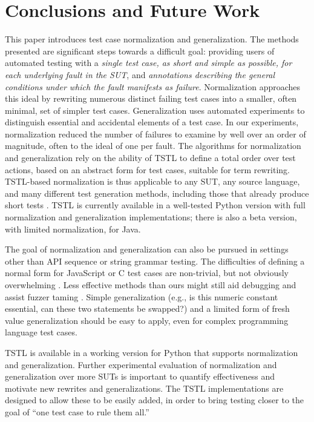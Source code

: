 \section{Conclusions and Future Work}

This paper introduces test case normalization and generalization.  The
methods presented are significant steps towards a difficult goal: providing
users of automated testing with a \emph{single test case, as short and
  simple as possible, for each underlying fault in the SUT}, and
\emph{annotations describing the general conditions under which the
  fault manifests as failure}.  Normalization approaches this ideal by
rewriting numerous distinct failing test cases into a smaller, often
minimal, set of simpler test cases.  Generalization uses
automated experiments to distinguish essential and accidental elements of
a test case.   In our experiments, normalization reduced the
number of failures to examine by well over an order of magnitude, often  to the ideal of one per fault.  The algorithms for normalization and generalization rely
on the ability of TSTL \cite{NFM15,ISSTA15} to define a total order
over test actions, based on an abstract form for test cases, suitable
for term rewriting.  TSTL-based normalization is thus applicable to
any SUT, any source language, and many different test generation methods,
including those that already produce short tests
\cite{FA11,SoftBET}.  TSTL is currently available in a well-tested Python
version with full normalization and generalization implementations;
there is also a
beta version, with limited normalization, for Java.


 The goal of normalization and generalization can also be pursued in
settings other than API sequence or string grammar testing.  The
difficulties of defining a normal form for JavaScript \cite{jsfunfuzz}
or C \cite{csmith} test cases are non-trivial, but not obviously
overwhelming \cite{CReduce}. Less effective methods
than ours might still aid debugging and assist fuzzer taming
\cite{PLDI13}.  Simple generalization (e.g., is this numeric constant
essential, can these two statements be swapped?) and a limited form of
fresh value generalization should be easy to apply, even for complex
programming language test cases.  

TSTL is available in a working version for Python \cite{tstl} that
supports normalization and generalization.  Further experimental
evaluation of normalization and generalization over more SUTs is
important to quantify effectiveness and motivate new rewrites and
generalizations.  The TSTL implementations are designed to allow these
to be easily added, in order to bring testing closer to the
goal of ``one test case to rule them all.''
